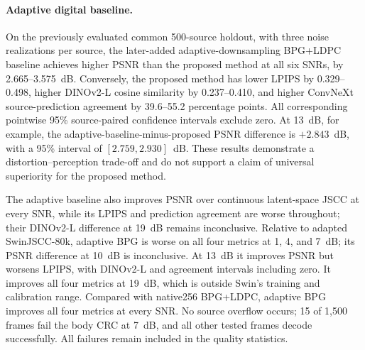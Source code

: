 \paragraph{Adaptive digital baseline.}
On the previously evaluated common 500-source holdout, with three noise realizations per source, the later-added adaptive-downsampling BPG+LDPC baseline achieves higher PSNR than the proposed method at all six SNRs, by 2.665--3.575~dB. Conversely, the proposed method has lower LPIPS by 0.329--0.498, higher DINOv2-L cosine similarity by 0.237--0.410, and higher ConvNeXt source-prediction agreement by 39.6--55.2 percentage points. All corresponding pointwise 95\% source-paired confidence intervals exclude zero. At 13~dB, for example, the adaptive-baseline-minus-proposed PSNR difference is $+2.843$~dB, with a 95\% interval of $[2.759,2.930]$~dB. These results demonstrate a distortion--perception trade-off and do not support a claim of universal superiority for the proposed method.

The adaptive baseline also improves PSNR over continuous latent-space JSCC at every SNR, while its LPIPS and prediction agreement are worse throughout; their DINOv2-L difference at 19~dB remains inconclusive. Relative to adapted SwinJSCC-80k, adaptive BPG is worse on all four metrics at 1, 4, and 7~dB; its PSNR difference at 10~dB is inconclusive. At 13~dB it improves PSNR but worsens LPIPS, with DINOv2-L and agreement intervals including zero. It improves all four metrics at 19~dB, which is outside Swin's training and calibration range. Compared with native256 BPG+LDPC, adaptive BPG improves all four metrics at every SNR. No source overflow occurs; 15 of 1,500 frames fail the body CRC at 7~dB, and all other tested frames decode successfully. All failures remain included in the quality statistics.
